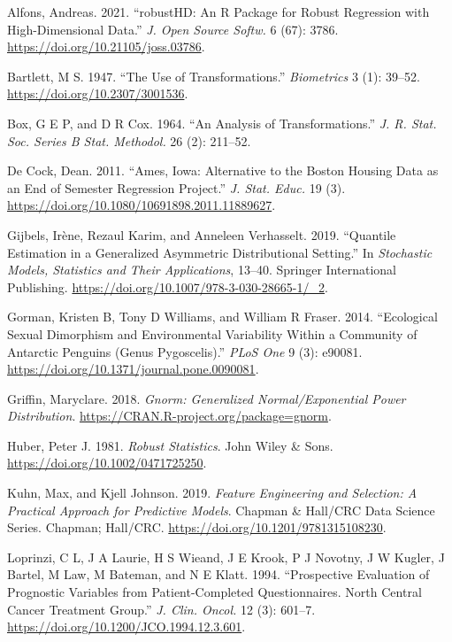 \documentclass[
  a4paper,
]{article}
\newlength{\cslhangindent}
\newenvironment{CSLReferences}[2] %
 {\begin{list}{}{%
  \setlength{\itemindent}{0pt}
  \setlength{\leftmargin}{0pt}
  \setlength{\parsep}{0pt}
  \ifodd #1
   \setlength{\leftmargin}{\cslhangindent}
   \setlength{\itemindent}{-1\cslhangindent}
  \fi
  \setlength{\itemsep}{#2\baselineskip}}}
 {\end{list}}
\begin{document}
\label{refs}
\begin{CSLReferences}{1}{0}
Alfons, Andreas. 2021. {``{robustHD}: An {R} Package for Robust
Regression with High-Dimensional Data.''} \emph{J. Open Source Softw.} 6
(67): 3786. \url{https://doi.org/10.21105/joss.03786}.

Bartlett, M S. 1947. {``The Use of Transformations.''} \emph{Biometrics}
3 (1): 39--52. \url{https://doi.org/10.2307/3001536}.

Box, G E P, and D R Cox. 1964. {``An Analysis of Transformations.''}
\emph{J. R. Stat. Soc. Series B Stat. Methodol.} 26 (2): 211--52.

De Cock, Dean. 2011. {``Ames, Iowa: Alternative to the Boston Housing
Data as an End of Semester Regression Project.''} \emph{J. Stat. Educ.}
19 (3). \url{https://doi.org/10.1080/10691898.2011.11889627}.

Gijbels, Irène, Rezaul Karim, and Anneleen Verhasselt. 2019. {``Quantile
Estimation in a Generalized Asymmetric Distributional Setting.''} In
\emph{Stochastic Models, Statistics and Their Applications}, 13--40.
Springer International Publishing.
\url{https://doi.org/10.1007/978-3-030-28665-1/_2}.

Gorman, Kristen B, Tony D Williams, and William R Fraser. 2014.
{``Ecological Sexual Dimorphism and Environmental Variability Within a
Community of Antarctic Penguins (Genus Pygoscelis).''} \emph{PLoS One} 9
(3): e90081. \url{https://doi.org/10.1371/journal.pone.0090081}.

Griffin, Maryclare. 2018. \emph{Gnorm: Generalized Normal/Exponential
Power Distribution}. \url{https://CRAN.R-project.org/package=gnorm}.

Huber, Peter J. 1981. \emph{Robust Statistics}. John Wiley \& Sons.
\url{https://doi.org/10.1002/0471725250}.

Kuhn, Max, and Kjell Johnson. 2019. \emph{Feature Engineering and
Selection: A Practical Approach for Predictive Models}. Chapman \&
Hall/CRC Data Science Series. Chapman; Hall/CRC.
\url{https://doi.org/10.1201/9781315108230}.

Loprinzi, C L, J A Laurie, H S Wieand, J E Krook, P J Novotny, J W
Kugler, J Bartel, M Law, M Bateman, and N E Klatt. 1994. {``Prospective
Evaluation of Prognostic Variables from Patient-Completed
Questionnaires. North Central Cancer Treatment Group.''} \emph{J. Clin.
Oncol.} 12 (3): 601--7. \url{https://doi.org/10.1200/JCO.1994.12.3.601}.


\end{CSLReferences}
\end{document}
